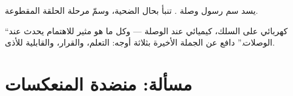 \begin{exercise}[$\star\star$]\label{exo:g8:nervous-communication:11}
يسد سم رسول وصلة . تنبأ بحال الضحية، وسمّ مرحلة
الحلقة المقطوعة.
\end{exercise}

\begin{exercise}[$\star\star\star$]\label{exo:g8:nervous-communication:12}
``كهربائي على السلك، كيميائي عند الوصلة --- وكل ما هو
مثير للاهتمام يحدث عند الوصلات.'' دافع عن الجملة الأخيرة
بثلاثة أوجه: التعلم، والقرار، والقابلية للأذى.
\end{exercise}

\section{مسألة: منضدة المنعكسات}

